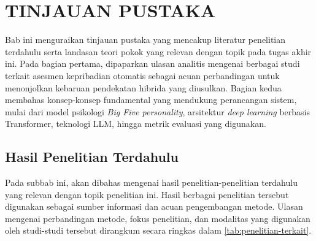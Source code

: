 \raggedbottom
\chapter{TINJAUAN PUSTAKA}

Bab ini menguraikan tinjauan pustaka yang mencakup literatur penelitian terdahulu serta landasan teori pokok yang relevan dengan topik pada tugas akhir ini. Pada bagian pertama, dipaparkan ulasan analitis mengenai berbagai studi terkait asesmen kepribadian otomatis sebagai acuan perbandingan untuk menonjolkan kebaruan pendekatan hibrida yang diusulkan. Bagian kedua membahas konsep-konsep fundamental yang mendukung perancangan sistem, mulai dari model psikologi \textit{Big Five personality}, arsitektur \textit{deep learning} berbasis Transformer, teknologi LLM, hingga metrik evaluasi yang digunakan.
\section{Hasil Penelitian Terdahulu}

Pada subbab ini, akan dibahas mengenai hasil penelitian-penelitian terdahulu yang relevan dengan topik penelitian ini. Hasil berbagai penelitian tersebut digunakan sebagai sumber informasi dan acuan pengembangan metode. Ulasan mengenai perbandingan metode, fokus penelitian, dan modalitas yang digunakan oleh studi-studi tersebut dirangkum secara ringkas dalam \autoref{tab:penelitian-terkait}.

